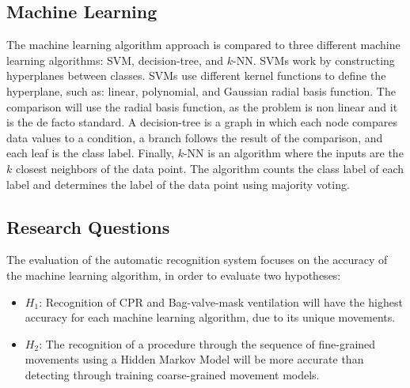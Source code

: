 \subsection{Machine Learning}
\label{sec:Data-Collection:Machine-Learning}
 The machine learning algorithm approach is compared to three different machine learning algorithms: SVM, decision-tree, and $k$-NN. SVMs work by constructing hyperplanes between classes. SVMs use different kernel functions to define the hyperplane, such as: linear, polynomial, and Gaussian radial basis function. The comparison will use the radial basis function, as the problem is non linear and it is the de facto standard. A decision-tree is a graph in which each node compares data values to a condition, a branch follows the result of the comparison, and each leaf is the class label. Finally, $k$-NN is an algorithm where the inputs are the $k$ closest neighbors of the data point. The algorithm counts the class label of each label and determines the label of the data point using majority voting. 
 
 \subsection{Research Questions}
 \label{sec:Data-Collection:Research-Questions}
 The evaluation of the automatic recognition system focuses on the accuracy of the machine learning algorithm, in order to evaluate two hypotheses:
 \begin{itemize}
 	\item $H_1$: Recognition of CPR and Bag-valve-mask ventilation will have the highest accuracy for each machine learning algorithm, due to its unique movements.
 	\item $H_2$: The recognition of a procedure through the sequence of fine-grained movements using a Hidden Markov Model will be more accurate than detecting through training coarse-grained movement models.
 \end{itemize}